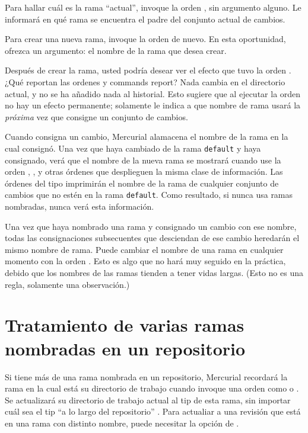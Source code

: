 Para hallar cuál es la rama ``actual'', invoque la orden
, sin argumento alguno. Le informará en qué rama se
encuentra el padre del conjunto actual de cambios.

Para crear una nueva rama, invoque la orden  de
nuevo. En esta oportunidad, ofrezca un argumento: el nombre de la rama
que desea crear.

Después de crear la rama, usted podría desear ver el efecto que tuvo
la orden .  ¿Qué reportan las ordenes  y
 commands report?
Nada cambia en el directorio actual, y no se ha añadido nada al
historial. Esto sugiere que al ejecutar la orden  no hay
un efecto permanente; solamente le indica a que nombre de rama usará
la \emph{próxima} vez que consigne un conjunto de cambios.

Cuando consigna un cambio, Mercurial alamacena el nombre de la rama en
la cual consignó.  Una vez que haya cambiado de la rama \texttt{default}
y haya consignado, verá que el nombre de la nueva rama se mostrará
cuando use la orden , , y otras órdenes que
desplieguen la misma clase de información.
Las órdenes del tipo  imprimirán el nombre de la rama de
cualquier conjunto de cambios que no estén en la rama
\texttt{default}. Como resultado, si nunca usa ramas nombradas, nunca
verá esta información.

Una vez que haya nombrado una rama y consignado un cambio con ese
nombre, todas las consignaciones subsecuentes que desciendan de ese
cambio heredarán el mismo nombre de rama. Puede cambiar el nombre de
una rama en cualquier momento con la orden .  
Esto es algo que no hará muy seguido en la práctica, debido que los
nombres de las ramas tienden a tener vidas largas.  (Esto no es una
regla, solamente una observación.)

\section{Tratamiento de varias ramas nombradas en un repositorio}

Si tiene más de una rama nombrada en un repositorio, Mercurial
recordará la rama en la cual está su directorio de trabajo cuando
invoque una orden como  o .  Se
actualizará su directorio de trabajo actual al tip de esta rama, sin
importar cuál sea el tip ``a lo largo del repositorio'' .  Para
actualiar a una revisión que está en una rama con distinto nombre,
puede necesitar la opción  de .


